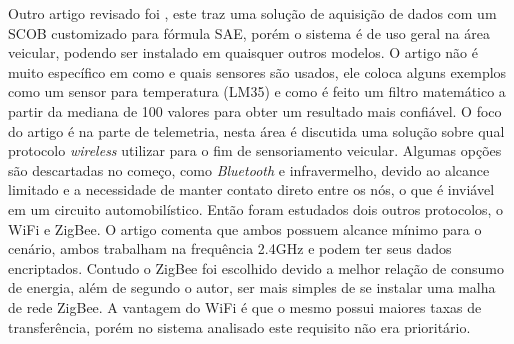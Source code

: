 Outro artigo revisado foi , este traz uma solução de aquisição de dados com um SCOB customizado para fórmula SAE, porém o sistema é de uso geral na área veicular, podendo ser instalado em quaisquer outros modelos. O artigo não é muito específico em como e quais sensores são usados, ele coloca alguns exemplos como um sensor para temperatura (LM35) e como é feito um filtro matemático a partir da mediana de 100 valores para obter um resultado mais confiável. O foco do artigo é na parte de telemetria, nesta área é discutida uma solução sobre qual protocolo \textit{wireless} utilizar para o fim de sensoriamento veicular. Algumas opções são descartadas no começo, como \textit{Bluetooth} e infravermelho, devido ao alcance limitado e a necessidade de manter contato direto entre os nós, o que é inviável em um circuito automobilístico. Então foram estudados dois outros protocolos, o WiFi e ZigBee. O artigo comenta que ambos possuem alcance mínimo para o cenário, ambos trabalham na frequência 2.4GHz e podem ter seus dados encriptados. Contudo o ZigBee foi escolhido devido a melhor relação de consumo de energia, além de segundo o autor, ser mais simples de se instalar uma malha de rede ZigBee. A vantagem do WiFi é que o mesmo possui maiores taxas de transferência, porém no sistema analisado este requisito não era prioritário.          


